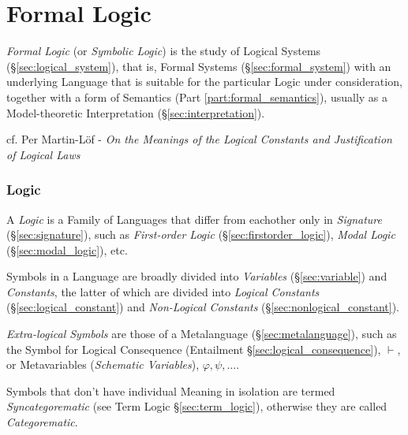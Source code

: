 \part{Formal Logic}\label{part:formal_logic}

\emph{Formal Logic} (or \emph{Symbolic Logic}) is the study of Logical
Systems (\S\ref{sec:logical_system}), that is, Formal Systems
(\S\ref{sec:formal_system}) with an underlying Language that is
suitable for the particular Logic under consideration, together with a
form of Semantics (Part \ref{part:formal_semantics}), usually as a
Model-theoretic Interpretation (\S\ref{sec:interpretation}).

cf. Per Martin-L\"of - \emph{On the Meanings of the Logical Constants and
  Justification of Logical Laws}



\section{Logic}\label{sec:logic}

A \emph{Logic} is a Family of Languages that differ from eachother
only in \emph{Signature} (\S\ref{sec:signature}), such as
\emph{First-order Logic} (\S\ref{sec:firstorder_logic}), \emph{Modal
  Logic} (\S\ref{sec:modal_logic}), etc.

Symbols in a Language are broadly divided into \emph{Variables}
(\S\ref{sec:variable}) and \emph{Constants}, the latter of which are
divided into \emph{Logical Constants} (\S\ref{sec:logical_constant})
and \emph{Non-Logical Constants} (\S\ref{sec:nonlogical_constant}).

\emph{Extra-logical Symbols} are those of a Metalanguage
(\S\ref{sec:metalanguage}), such as the Symbol for Logical Consequence
(Entailment \S\ref{sec:logical_consequence}), $\vdash$, or
Metavariables (\emph{Schematic Variables}), $\varphi, \psi, \ldots$.

Symbols that don't have individual Meaning in isolation are termed
\emph{Syncategorematic} (see Term Logic \S\ref{sec:term_logic}),
otherwise they are called \emph{Categorematic}.

